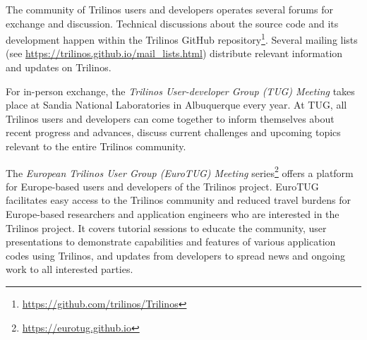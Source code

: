 


The community of Trilinos users and developers operates several forums for exchange and discussion.
Technical discussions about the source code and its development happen within the Trilinos GitHub repository\footnote{\url{https://github.com/trilinos/Trilinos}}.
Several mailing lists (see \url{https://trilinos.github.io/mail_lists.html}) distribute relevant information and updates on Trilinos.

For in-person exchange, the \emph{Trilinos User-developer Group (TUG) Meeting} takes place at Sandia National Laboratories in Albuquerque every year.
At TUG, all Trilinos users and developers can come together to inform themselves about recent progress and advances,
discuss current challenges and upcoming topics relevant to the entire Trilinos community.

The \emph{European Trilinos User Group (EuroTUG) Meeting} series\footnote{\url{https://eurotug.github.io}}
offers a platform for Europe-based users and developers of the Trilinos project.
EuroTUG facilitates easy access to the Trilinos community and reduced travel burdens for Europe-based researchers and application engineers
who are interested in the Trilinos project.
It covers tutorial sessions to educate the community,
user presentations to demonstrate capabilities and features of various application codes using Trilinos,
and updates from developers to spread news and ongoing work to all interested parties.
